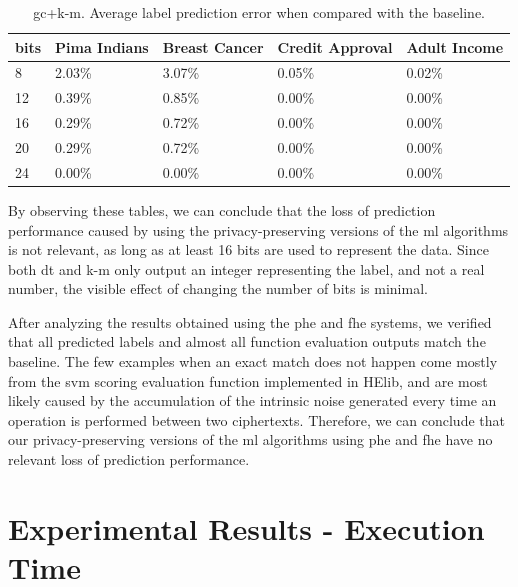 \begin{table}[htp]
\centering
\caption{\acs{gc}+\acs{k-m}. Average label prediction error when compared with the baseline.}
\label{table:avgErrorKM}
\begin{tabular}{|l|l|l|l|l|}
\hline
\textbf{bits} & \textbf{Pima Indians} & \textbf{Breast Cancer} & \textbf{Credit Approval} & \textbf{Adult Income} \\ \hline
8    & 2.03\%       & 3.07\%        &    0.05\%       &     0.02\%   \\ \hline
12   & 0.39\%       & 0.85\%        &    0.00\%       &     0.00\%   \\ \hline
16   & 0.29\%       & 0.72\%        &    0.00\%       &     0.00\%   \\ \hline
20   & 0.29\%       & 0.72\%        &    0.00\%       &     0.00\%   \\ \hline
24   & 0.00\%       & 0.00\%        &    0.00\%       &     0.00\%   \\ \hline
\end{tabular}
\end{table}

By observing these tables, we can conclude that the loss of prediction performance caused by using the privacy-preserving versions of the \ac{ml} algorithms is not relevant, as long as at least 16 bits are used to represent the data. Since both \ac{dt} and \ac{k-m} only output an integer representing the label, and not a real number, the visible effect of changing the number of bits is minimal.

After analyzing the results obtained using the \ac{phe} and \ac{fhe} systems, we verified that all predicted labels and almost all function evaluation outputs match the baseline. The few examples when an exact match does not happen come mostly from the \ac{svm} scoring evaluation function implemented in HElib, and are most likely caused by the accumulation of the intrinsic noise generated every time an operation is performed between two ciphertexts. Therefore, we can conclude that our privacy-preserving versions of the \ac{ml} algorithms using \ac{phe} and \ac{fhe} have no relevant loss of prediction performance.

\section{Experimental Results - Execution Time}
\label{sec:ExperimentalResultsExecutionTime}

